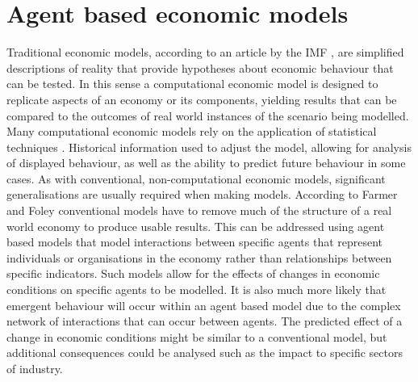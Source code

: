 \documentclass[11pt]{article}
\begin{document}
\section{Agent based economic models}
Traditional economic models, according to an article by the IMF \cite{imf}, are simplified descriptions of reality that provide hypotheses about economic behaviour that can be tested. In this sense a computational economic model is designed to replicate aspects of an economy or its components, yielding results that can be compared to the outcomes of real world instances of the scenario being modelled. Many computational economic models rely on the application of statistical techniques \cite{estrella98}. Historical information used to adjust the model, allowing for analysis of displayed behaviour, as well as the ability to predict future behaviour in some cases. As with conventional, non-computational economic models, significant generalisations are usually required when making models. According to Farmer and Foley \cite{farmer09} conventional models have to remove much of the structure of a real world economy to produce usable results. This can be addressed using agent based models that model interactions between specific agents that represent individuals or organisations in the economy rather than relationships between specific indicators. Such models allow for the effects of changes in economic conditions on specific agents to be modelled. It is also much more likely that emergent behaviour will occur within an agent based model due to the complex network of interactions that can occur between agents. The predicted effect of a change in economic conditions might be similar to a conventional model, but additional consequences could be analysed such as the impact to specific sectors of industry.
\end{document}
